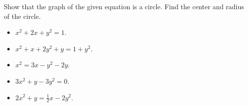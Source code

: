 \begin{frame}
\begin{example}
Show that the graph of the given equation is a circle. Find the center and radius of the circle.

\begin{itemize}
\item $x^2+2x+y^2=1$.
\item $x^2+x+2y^2+y=1+y^2$.
\item $x^2=3x-y^2-2y$.
\item $3x^2+y-3y^2=0$.
\item $2x^2+y=\frac{1}{2}x-2y^2$.
\end{itemize}
\end{example}
\end{frame}